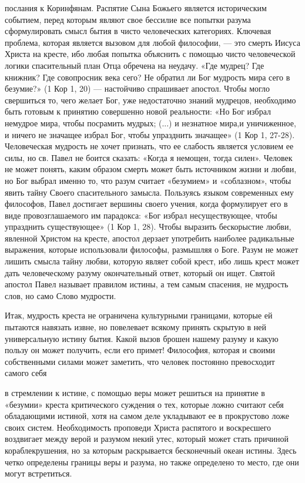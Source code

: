 \documentclass[a5paper,10pt]{article}
\begin{document}
послания к Коринфянам. Распятие Сына Божьего является историческим событием,
перед которым являют свое бессилие все попытки разума сформулировать смысл
бытия в чисто человеческих категориях. Ключевая проблема, которая является
вызовом для любой философии, — это смерть Иисуса Христа на кресте, ибо любая
попытка объяснить с помощью чисто человеческой логики спасительный план Отца
обречена на неудачу. «Где мудрец? Где книжник? Где совопросник века сего? Не
обратил ли Бог мудрость мира сего в безумие?» (1 Кор 1, 20) — настойчиво
спрашивает апостол. Чтобы могло свершиться то, чего желает Бог, уже
недостаточно знаний мудрецов, необходимо быть готовым к принятию совершенно
новой реальности: «Но Бог избрал немудрое мира, чтобы посрамить мудрых; (...) и
незнатное мира,и уничиженное, и ничего не значащее избрал Бог, чтобы упразднить
значащее» (1 Кор 1, 27-28). Человеческая мудрость не хочет признать, что ее
слабость является условием ее силы, но св. Павел не боится сказать: «Когда я
немощен, тогда силен». Человек не может понять, каким образом смерть может быть
источником жизни и любви, но Бог выбрал именно то, что разум считает «безумием»
и «соблазном», чтобы явить тайну Своего спасительного замысла. Пользуясь языком
современных ему философов, Павел достигает вершины своего учения, когда
формулирует его в виде провозглашаемого им парадокса: «Бог избрал
несуществующее, чтобы упразднить существующее» (1 Кор 1, 28). Чтобы выразить
бескорыстие любви, явленной Христом на кресте, апостол дерзает употребить
наиболее радикальные выражения, которые использовали философы, размышляя о
Боге. Разум не может лишить смысла тайну любви, которую являет собой крест, ибо
лишь крест может дать человеческому разуму окончательный ответ, который он
ищет. Святой апостол Павел называет правилом истины, а тем самым спасения, не
мудрость слов, но само Слово мудрости.

Итак, мудрость креста не ограничена культурными границами, которые ей пытаются
навязать извне, но повелевает всякому принять скрытую в ней универсальную
истину бытия. Какой вызов брошен нашему разуму и какую пользу он может
получить, если его примет! Философия, которая и своими собственными силами
может заметить, что человек постоянно превосходит самого себя

в стремлении к истине, с помощью веры может решиться на принятие в «безумии»
креста критического суждения о тех, которые ложно считают себя обладающими
истиной, хотя на самом деле укладывают ее в прокрустово ложе своих систем.
Необходимость проповеди Христа распятого и воскресшего воздвигает между верой и
разумом некий утес, который может стать причиной кораблекрушения, но за которым
раскрывается бесконечный океан истины. Здесь четко определены границы веры и
разума, но также определено то место, где они могут встретиться.
\end{document}

